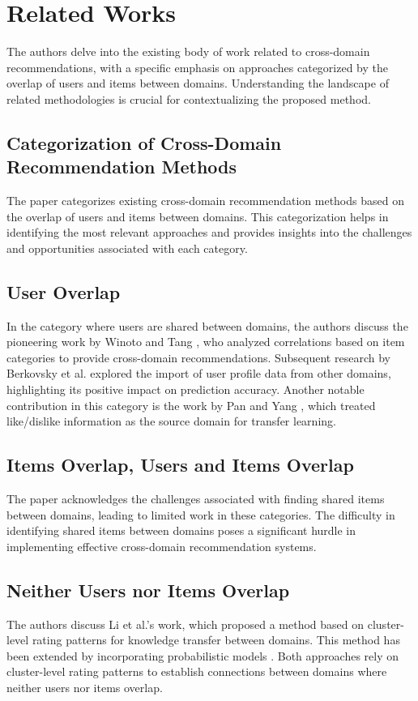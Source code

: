 \documentclass{article}
\begin{document}
\section{Related Works}
The authors delve into the existing body of work related to cross-domain recommendations, with a specific emphasis on approaches categorized by the overlap of users and items between domains. Understanding the landscape of related methodologies is crucial for contextualizing the proposed method.

\subsection{Categorization of Cross-Domain Recommendation Methods}
The paper categorizes existing cross-domain recommendation methods based on the overlap of users and items between domains. This categorization helps in identifying the most relevant approaches and provides insights into the challenges and opportunities associated with each category.

\subsection{User Overlap}
In the category where users are shared between domains, the authors discuss the pioneering work by Winoto and Tang \cite{winoto_tang}, who analyzed correlations based on item categories to provide cross-domain recommendations. Subsequent research by Berkovsky et al. \cite{berkovsky} explored the import of user profile data from other domains, highlighting its positive impact on prediction accuracy. Another notable contribution in this category is the work by Pan and Yang \cite{pan_yang}, which treated like/dislike information as the source domain for transfer learning.

\subsection{Items Overlap, Users and Items Overlap}
The paper acknowledges the challenges associated with finding shared items between domains, leading to limited work in these categories. The difficulty in identifying shared items between domains poses a significant hurdle in implementing effective cross-domain recommendation systems.

\subsection{Neither Users nor Items Overlap}
The authors discuss Li et al.'s \cite{li} work, which proposed a method based on cluster-level rating patterns for knowledge transfer between domains. This method has been extended by incorporating probabilistic models \cite{probabilistic_models}. Both approaches rely on cluster-level rating patterns to establish connections between domains where neither users nor items overlap.
\end{document}
